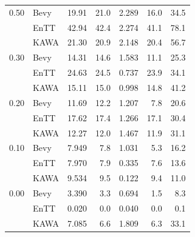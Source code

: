 \documentclass[conference]{IEEEtran}
\begin{document}
\begin{table}[htbp]
\begin{center}
\begin{tabular}{|c|l|r|r|r|r|r|}
                0.50 & Bevy           & 19.91         & 21.0            & 2.289             & 16.0         & 34.5         \\
                & EnTT               & 42.94         & 42.4            & 2.274             & 41.1         & 78.1         \\
                & KAWA             & 21.30         & 20.9            & 2.148             & 20.4         & 56.7         \\
                \hline
                0.30 & Bevy           & 14.31         & 14.6            & 1.583             & 11.1         & 25.3         \\
                & EnTT               & 24.63         & 24.5            & 0.737             & 23.9         & 34.1         \\
                & KAWA             & 15.11         & 15.0            & 0.998             & 14.8         & 41.2         \\
                \hline
                0.20 & Bevy           & 11.69         & 12.2            & 1.207             & 7.8          & 20.6         \\
                & EnTT               & 17.62         & 17.4            & 1.266             & 17.1         & 30.4         \\
                & KAWA             & 12.27         & 12.0            & 1.467             & 11.9         & 31.1         \\
                \hline
                0.10 & Bevy           & 7.949         & 7.8             & 1.031             & 5.3          & 16.2         \\
                & EnTT               & 7.970         & 7.9             & 0.335             & 7.6          & 13.6         \\
                & KAWA             & 9.534         & 9.5             & 0.122             & 9.4          & 11.0         \\
                \hline
                0.00 & Bevy           & 3.390         & 3.3             & 0.694             & 1.5          & 8.3          \\
                & EnTT               & 0.020         & 0.0             & 0.040             & 0.0          & 0.1          \\
                & KAWA             & 7.085         & 6.6             & 1.809             & 6.3          & 33.1         \\
                \hline
            \end{tabular}
        \end{center}\label{tab:results-benchmark-2}
    \end{table}
\end{document}
